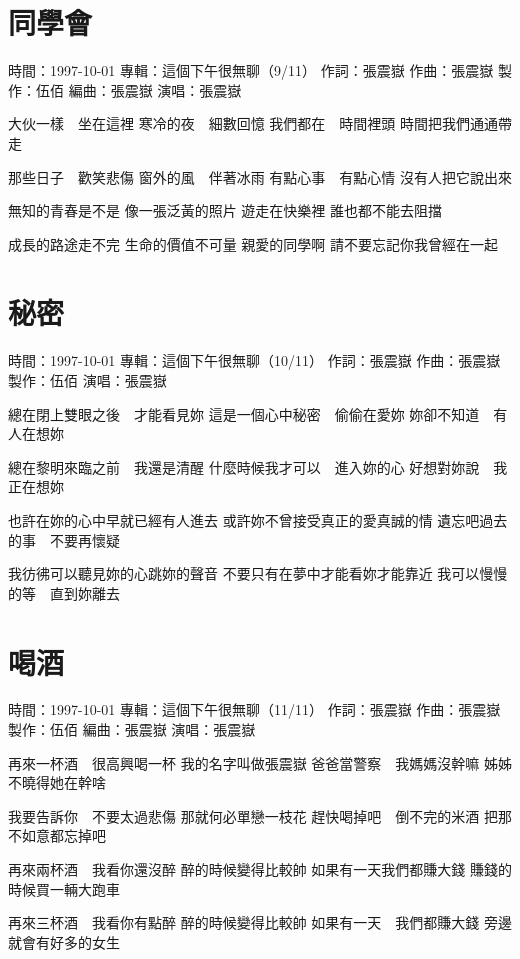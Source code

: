 \documentclass[UTF8,a4paper,oneside,twocolumn,12pt]{ctexbook}
\newcommand{\infopair}[2]{\textbullet #1：#2}
\newcommand{\zc}[1][伍佰]{\infopair{作詞}{#1}}
\newcommand{\zq}[1][伍佰]{\infopair{作曲}{#1}}
\newcommand{\bq}[1][伍佰]{\infopair{編曲}{#1}}
\newcommand{\zj}[1]{\infopair{專輯}{#1}}
\newcommand{\zz}[1]{\infopair{製作}{#1}}
\newcommand{\sj}[1]{\infopair{時間}{#1}}
\newenvironment{info}{\begin{flushleft}\kaishu
	}
	{\end{flushleft}\normalsize\yahei\par}
\newenvironment{lyric}{
	}
{}
\begin{document}
\section{同學會}
\begin{info}
	\sj{1997-10-01}
	\zj{這個下午很無聊（9/11）}
	\zc[張震嶽]
	\zq[張震嶽]
	\zz{伍佰}
	\bq[張震嶽]
	\infopair{演唱}{張震嶽}
\end{info}
\begin{lyric}
	大伙一樣　坐在這裡
	寒冷的夜　細數回憶
	我們都在　時間裡頭
	時間把我們通通帶走

	那些日子　歡笑悲傷
	窗外的風　伴著冰雨
	有點心事　有點心情
	沒有人把它說出來

	無知的青春是不是
	像一張泛黃的照片
	遊走在快樂裡
	誰也都不能去阻擋

	成長的路途走不完
	生命的價值不可量
	親愛的同學啊
	請不要忘記你我曾經在一起
\end{lyric}

\section{秘密}
\begin{info}
	\sj{1997-10-01}
	\zj{這個下午很無聊（10/11）}
	\zc[張震嶽]
	\zq[張震嶽]
	\zz{伍佰}
	\infopair{演唱}{張震嶽}
\end{info}
\begin{lyric}
	總在閉上雙眼之後　才能看見妳
	這是一個心中秘密　偷偷在愛妳
	妳卻不知道　有人在想妳

	總在黎明來臨之前　我還是清醒
	什麼時候我才可以　進入妳的心
	好想對妳說　我正在想妳

	也許在妳的心中早就已經有人進去
	或許妳不曾接受真正的愛真誠的情
	遺忘吧過去的事　不要再懷疑

	我彷彿可以聽見妳的心跳妳的聲音
	不要只有在夢中才能看妳才能靠近
	我可以慢慢的等　直到妳離去
\end{lyric}

\section{喝酒}
\begin{info}
	\sj{1997-10-01}
	\zj{這個下午很無聊（11/11）}
	\zc[張震嶽]
	\zq[張震嶽]
	\zz{伍佰}
	\bq[張震嶽]
	\infopair{演唱}{張震嶽}
\end{info}
\begin{lyric}
	再來一杯酒　很高興喝一杯
	我的名字叫做張震嶽
	爸爸當警察　我媽媽沒幹嘛
	姊姊不曉得她在幹啥

	我要告訴你　不要太過悲傷
	那就何必單戀一枝花
	趕快喝掉吧　倒不完的米酒
	把那不如意都忘掉吧

	再來兩杯酒　我看你還沒醉
	醉的時候變得比較帥
	如果有一天我們都賺大錢
	賺錢的時候買一輛大跑車

	再來三杯酒　我看你有點醉
	醉的時候變得比較帥
	如果有一天　我們都賺大錢
	旁邊就會有好多的女生
\end{lyric}
\end{document}
